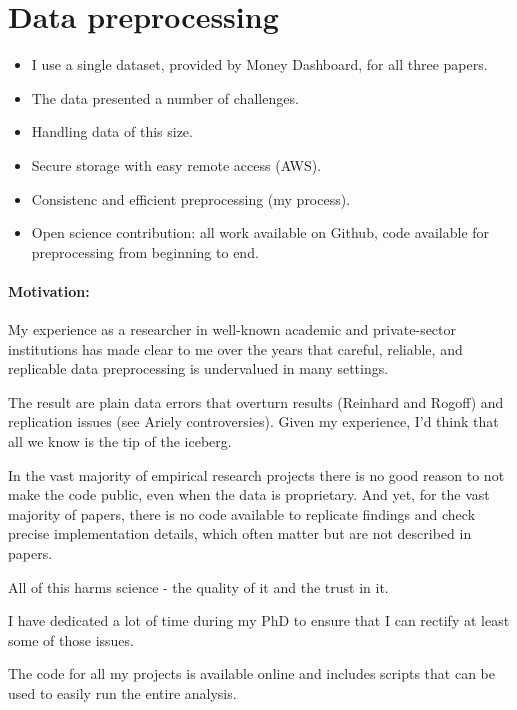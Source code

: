 \section{Data preprocessing}%
\label{sec:data_preprocessing}

\begin{itemize}
    \item I use a single dataset, provided by Money Dashboard, for all three
        papers.

    \item The data presented a number of challenges.

    \item Handling data of this size.

    \item Secure storage with easy remote access (AWS).

    \item Consistenc and efficient preprocessing (my process).

    \item Open science contribution: all work available on Github, code
        available for preprocessing from beginning to end.
\end{itemize}

\paragraph{Motivation:}%
\label{par:motivation_}

My experience as a researcher in well-known academic and private-sector
institutions has made clear to me over the years that careful, reliable, and
replicable data preprocessing is undervalued in many settings.

The result are plain data errors that overturn results (Reinhard and Rogoff)
and replication issues (see Ariely controversies). Given my experience, I'd
think that all we know is the tip of the iceberg.

In the vast majority of empirical research projects there is no good reason to
not make the code public, even when the data is proprietary. And yet, for the
vast majority of papers, there is no code available to replicate findings and
check precise implementation details, which often matter but are not described
in papers.

All of this harms science - the quality of it and the trust in it.

I have dedicated a lot of time during my PhD to ensure that I can rectify at
least some of those issues.

The code for all my projects is available online and includes scripts that can
be used to easily run the entire analysis.
